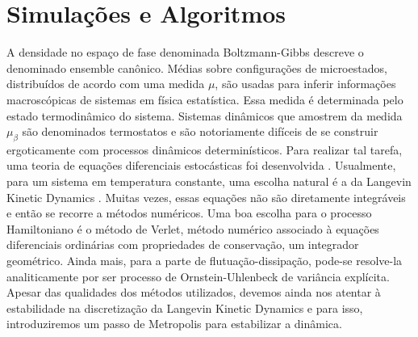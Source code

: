 \chapter{Simulações e Algoritmos}
\label{Capitulo: Simulações}

A densidade no espaço de fase denominada Boltzmann-Gibbs descreve o denominado ensemble canônico. Médias sobre configurações de microestados, distribuídos de acordo com uma medida $\mu$, são usadas para inferir informações macroscópicas de sistemas em física estatística. Essa medida é determinada pelo estado termodinâmico do sistema. Sistemas dinâmicos que amostrem da medida $\mu_{\beta}$ são denominados termostatos e são notoriamente difíceis de se construir ergoticamente com processos dinâmicos determinísticos. Para realizar tal tarefa, uma teoria de equações diferenciais estocásticas foi desenvolvida \cite{leimmolecular}. Usualmente, para um sistema em temperatura constante, uma escolha natural é a da Langevin Kinetic Dynamics \cite{Stoltz2018}. Muitas vezes, essas equações não são diretamente integráveis e então se recorre a métodos numéricos. Uma boa escolha para o processo Hamiltoniano é o método de Verlet, método numérico associado à equações diferenciais ordinárias com propriedades de conservação, um integrador geométrico. Ainda mais, para a parte de flutuação-dissipação, pode-se resolve-la analiticamente por ser processo de Ornstein-Uhlenbeck de variância explícita. Apesar das qualidades dos métodos utilizados, devemos ainda nos atentar à estabilidade na discretização da Langevin Kinetic Dynamics e para isso, introduziremos um passo de Metropolis para estabilizar a dinâmica.



